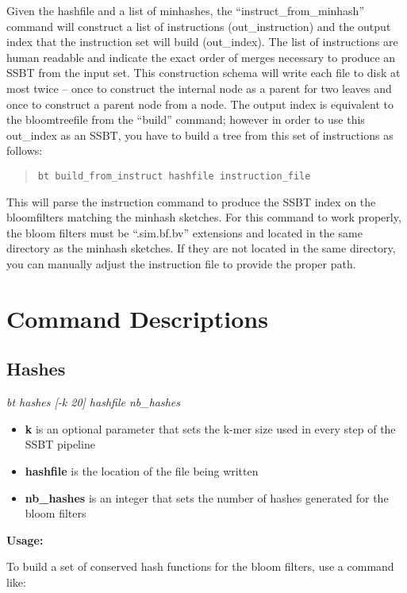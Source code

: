 \documentclass{article}
\begin{document}
Given the hashfile and a list of minhashes, the ``instruct\_from\_minhash'' command will construct a list of instructions (out\_instruction) and the output index that the instruction set will build (out\_index). The list of instructions are human readable and indicate the exact order of merges necessary to produce an SSBT from the input set. This construction schema will write each file to disk at most twice -- once to construct the internal node as a parent for two leaves and once to construct a parent node from a node. The output index is equivalent to the bloomtreefile from the ``build'' command; however in order to use this out\_index as an SSBT, you have to build a tree from this set of instructions as follows:

\begin{quote}
\begin{verbatim}
bt build_from_instruct hashfile instruction_file
\end{verbatim}
\end{quote}

This will parse the instruction command to produce the SSBT index on the bloomfilters matching the minhash sketches. For this command to work properly, the bloom filters must be ``.sim.bf.bv'' extensions and located in the same directory as the minhash sketches. If they are not located in the same directory, you can manually adjust the instruction file to provide the proper path. 

\section{Command Descriptions}

\subsection{Hashes} 
\textit{bt hashes [-k 20] hashfile nb\_hashes}
\begin{itemize}
\item \textbf{k} is an optional parameter that sets the k-mer size used in every step of the SSBT pipeline
\item \textbf{hashfile} is the location of the file being written
\item \textbf{nb\_hashes} is an integer that sets the number of hashes generated for the bloom filters
\end{itemize}
\textbf{Usage:}

To build a set of conserved hash functions for the bloom filters, use a command like: \\
\end{document}
